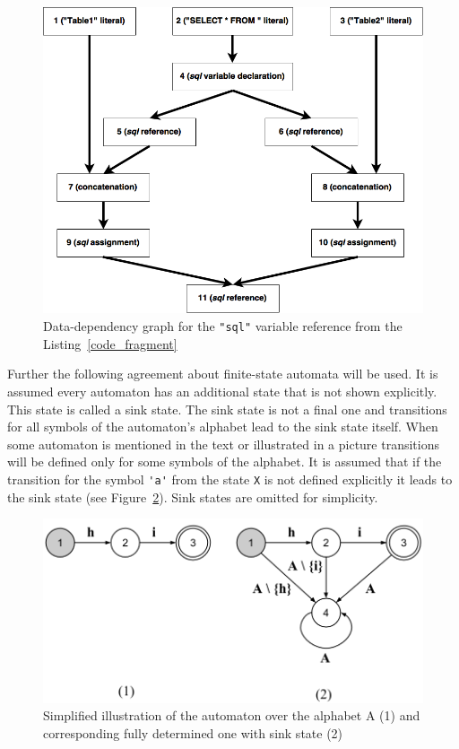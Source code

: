 \begin{figure}[h!]
    \begin{center}
        \includegraphics[scale=0.3]{Figures/Dependency_graph.png}
    \end{center}
    \caption{Data-dependency graph for the \texttt{"sql"} variable reference from the Listing~\ref{code_fragment}}
    \label{data_dependency_pic}
\end{figure} 

Further the following agreement about finite-state automata will be used. It is assumed every automaton has an additional state that is not shown explicitly. This state is called a sink state. The sink state is not a final one and transitions for all symbols of the automaton's alphabet lead to the sink state itself. When some automaton is mentioned in the text or illustrated in a picture transitions will be defined only for some symbols of the alphabet. It is assumed that if the transition for the symbol  \verb|'a'| from the state \verb|X| is not defined explicitly it leads to the sink state (see Figure~\ref{hi_pic}). Sink states are omitted for simplicity.

\begin{figure}[h!]
    \begin{center}
        \includegraphics[scale=0.3]{Figures/automaton_with_sink.png}
    \end{center}
    \caption{Simplified illustration of the automaton over the alphabet A (1) and corresponding fully determined one with sink state (2)}
    \label{hi_pic}
\end{figure} 

